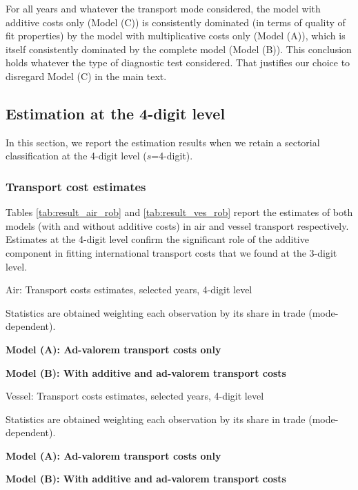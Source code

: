 \documentclass[11pt,twoside, authoryear]{elsarticle}
\begin{document}
For all years and whatever the transport mode considered, the model with additive costs only (Model (C)) is consistently dominated (in terms of quality of fit properties) by the model with multiplicative costs only (Model (A)), which is itself consistently dominated by the complete model (Model (B)). This conclusion holds whatever the type of diagnostic test considered. That justifies our choice to disregard Model (C) in the main text.


\newpage
\setcounter{table}{0}
\renewcommand{\thetable}{B.\arabic{table}}

\subsection{Estimation at the 4-digit level \label{app:4digit}}

In this section, we report the estimation results when we retain a sectorial classification at the 4-digit level ($s$=4-digit).

\subsubsection{Transport cost estimates}


Tables \ref{tab:result_air_rob} and \ref{tab:result_ves_rob} report the estimates of both models (with and without additive costs) in air and vessel transport respectively. Estimates at the 4-digit level confirm the significant role of the additive component in fitting international transport costs that we found at the 3-digit level.


\begin{table}[htbp]
	\centering
		\caption{Air: Transport costs estimates, selected years, 4-digit level}
		\label{tab:result_air_rob}%
		
		\begin{tablenotes}
			\scriptsize
			\item Statistics are obtained weighting each observation by its share in trade (mode-dependent).
			\item \textbf{Model (A): Ad-valorem transport costs only}
			\item \textbf{Model (B): With additive and ad-valorem transport costs}
		\end{tablenotes}
\end{table}%



\begin{table}[htbp]
	\centering
		\caption{Vessel: Transport costs estimates, selected years, 4-digit level}
		\label{tab:result_ves_rob}%
		
		\begin{tablenotes}
			\scriptsize
			\item Statistics are obtained weighting each observation by its share in trade (mode-dependent).
			\item \textbf{Model (A): Ad-valorem transport costs only}
			\item \textbf{Model (B): With additive and ad-valorem transport costs}
		\end{tablenotes}
\end{table}
\end{document}
